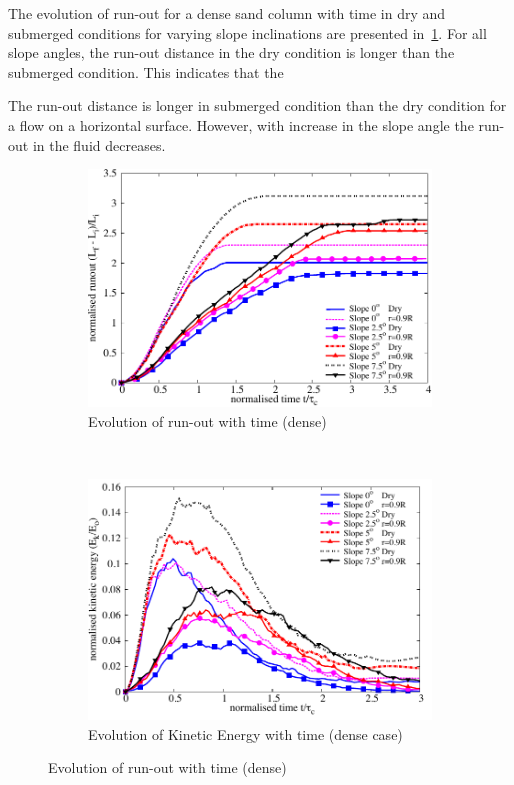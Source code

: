 The evolution of run-out for a dense sand column with time in dry and submerged 
conditions for varying slope inclinations are presented 
in~\cref{fig:run_dense}. For all slope angles, the run-out distance in the dry 
condition is longer than the submerged condition. This indicates that the  

The 
run-out distance is longer in submerged condition 
than the dry condition for a flow on a horizontal surface. However, with 
increase in the slope angle the run-out in the fluid decreases.

\begin{figure}
\centering
\begin{subfigure}[t]{0.95\textwidth}
\centering
\includegraphics[width=0.95\columnwidth]{Runout_dense_slope}
\caption{Evolution of run-out with time (dense)}
\label{fig:run_dense}
\end{subfigure}\\
\begin{subfigure}[t]{0.95\textwidth}
\centering
\includegraphics[width=0.95\columnwidth]{KE_dense_slope}
\caption{Evolution of Kinetic Energy with time (dense case)}
\label{fig:KE_dense}
\end{subfigure}
\caption{Evolution of run-out with time (dense)}
\label{fig:run_KE_dense}
\end{figure}


